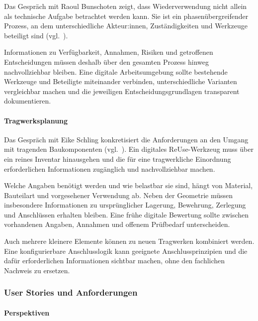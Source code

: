 \documentclass[type=zwischenbericht]{zukunftbau}
\begin{document}
\begin{SemioNest}
\begin{SemioNest}
Das Gespräch mit Raoul Bunschoten zeigt, dass Wiederverwendung nicht allein als technische Aufgabe betrachtet werden kann. Sie ist ein phasenübergreifender Prozess, an dem unterschiedliche Akteur:innen, Zuständigkeiten und Werkzeuge beteiligt sind (vgl.\ ).

Informationen zu Verfügbarkeit, Annahmen, Risiken und getroffenen Entscheidungen müssen deshalb über den gesamten Prozess hinweg nachvollziehbar bleiben. Eine digitale Arbeitsumgebung sollte bestehende Werkzeuge und Beteiligte miteinander verbinden, unterschiedliche Varianten vergleichbar machen und die jeweiligen Entscheidungsgrundlagen transparent dokumentieren.

\paragraph{Tragwerksplanung}

Das Gespräch mit Eike Schling konkretisiert die Anforderungen an den Umgang mit tragenden Baukomponenten (vgl.\ ). Ein digitales ReUse-Werkzeug muss über ein reines Inventar hinausgehen und die für eine tragwerkliche Einordnung erforderlichen Informationen zugänglich und nachvollziehbar machen.

Welche Angaben benötigt werden und wie belastbar sie sind, hängt von Material, Bauteilart und vorgesehener Verwendung ab. Neben der Geometrie müssen insbesondere Informationen zu ursprünglicher Lagerung, Bewehrung, Zerlegung und Anschlüssen erhalten bleiben. Eine frühe digitale Bewertung sollte zwischen vorhandenen Angaben, Annahmen und offenem Prüfbedarf unterscheiden.

Auch mehrere kleinere Elemente können zu neuen Tragwerken kombiniert werden. Eine konfigurierbare Anschlusslogik kann geeignete Anschlussprinzipien und die dafür erforderlichen Informationen sichtbar machen, ohne den fachlichen Nachweis zu ersetzen.

\end{SemioNest}

\end{SemioNest}

\subsubsection{User Stories und Anforderungen}

\paragraph{Perspektiven}
\end{document}
